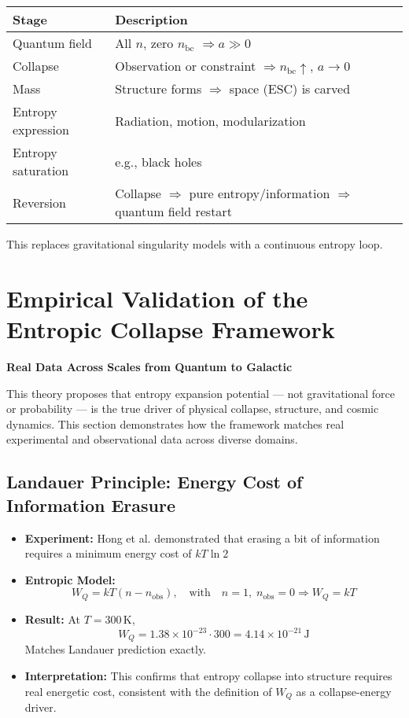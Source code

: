 \documentclass[12pt]{article}
\begin{document}
\begin{center}
\begin{tabular}{|l|p{11cm}|}
\hline
\textbf{Stage} & \textbf{Description} \\
\hline
Quantum field & All $n$, zero $n_{\text{bc}}$ $\Rightarrow a \gg 0$ \\
\hline
Collapse & Observation or constraint $\Rightarrow n_{\text{bc}} \uparrow$, $a \to 0$ \\
\hline
Mass & Structure forms $\Rightarrow$ space (ESC) is carved \\
\hline
Entropy expression & Radiation, motion, modularization \\
\hline
Entropy saturation & e.g., black holes \\
\hline
Reversion & Collapse $\Rightarrow$ pure entropy/information $\Rightarrow$ quantum field restart \\
\hline
\end{tabular}
\end{center}

This replaces gravitational singularity models with a continuous entropy loop.

\section{Empirical Validation of the Entropic Collapse Framework}

\textbf{Real Data Across Scales from Quantum to Galactic}

This theory proposes that entropy expansion potential — not gravitational force or probability — is the true driver of physical collapse, structure, and cosmic dynamics. This section demonstrates how the framework matches real experimental and observational data across diverse domains.

\subsection{Landauer Principle: Energy Cost of Information Erasure}

\begin{itemize}
    \item \textbf{Experiment:} Hong et al. demonstrated that erasing a bit of information requires a minimum energy cost of $kT \ln 2$
    \item \textbf{Entropic Model:}
    \[
    W_Q = kT(n - n_{\text{obs}}), \quad \text{with} \quad n = 1,\; n_{\text{obs}} = 0 \Rightarrow W_Q = kT
    \]
    \item \textbf{Result:} At $T = 300\, \text{K}$,
    \[
    W_Q = 1.38 \times 10^{-23} \cdot 300 = 4.14 \times 10^{-21}\, \text{J}
    \]
    Matches Landauer prediction exactly.
    
    \item \textbf{Interpretation:} This confirms that entropy collapse into structure requires real energetic cost, consistent with the definition of $W_Q$ as a collapse-energy driver.
\end{itemize}
\end{document}
